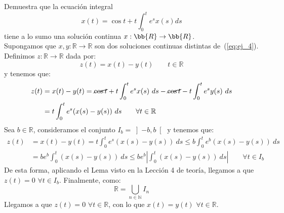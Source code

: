\documentclass[12pt]{article}
\begin{document}
    \begin{ejercicio}
        Demuestra que la ecuación integral
        \begin{equation}\label{eq:ej_4}
            x(t)=\cos t+t\int_0^t e^{s}x(s)ds
        \end{equation}
        tiene a lo sumo una solución continua $x:\bb{R}\to\bb{R}$.\\

        \noindent
        Supongamos que $x,y:\mathbb{R}\rightarrow\mathbb{R}$ son dos soluciones continuas distintas de~(\ref{eq:ej_4}). Definimos $z:\mathbb{R}\rightarrow\mathbb{R}$ dada por:
        \begin{equation*}
            z(t) = x(t) - y(t) \qquad t\in \mathbb{R}
        \end{equation*}
        y tenemos que:
        \begin{align*}
            z(t) &= x(t) - y(t) = \cancel{\cos t }+ t\int_{0}^{t} e^s x(s)~ds- \cancel{\cos t }- t\int_{0}^{t} e^sy(s)~ds  \\
                 &= t\int_{0}^{t} e^s(x(s)-y(s))~ds  \qquad \forall t\in \mathbb{R}
        \end{align*}
        Sea $b\in \mathbb{R}$, consideramos el conjunto $I_b=\left]-b,b\right[$ y tenemos que:
        \begin{align*}
            z(t) &= x(t)-y(t)= t \int_{0}^{t} e^s(x(s)-y(s))~ds  \leq b\int_{0}^{t} e^b (x(s)-y(s))~ds  \\
                 &= be^b \int_{0}^{t} (x(s)-y(s))~ds \leq  be^b \left|\int_{0}^{t} (x(s)-y(s))~ds \right| \qquad \forall t\in I_b
        \end{align*}
        De esta forma, aplicando el Lema visto en la Lección 4 de teoría, llegamos a que $z(t) = 0$ $\forall t\in I_b$. Finalmente, como:
        \begin{equation*}
            \mathbb{R} = \bigcup_{n\in \mathbb{N}} I_n
        \end{equation*}
        Llegamos a que $z(t) = 0$ $\forall t\in \mathbb{R}$, con lo que $x(t) = y(t)$ $\forall t\in \mathbb{R}$.
    \end{ejercicio}
\end{document}
